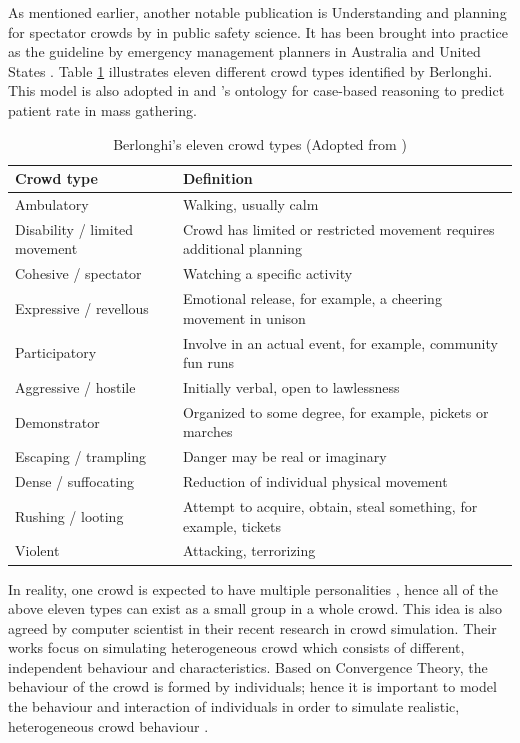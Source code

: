 As mentioned earlier, another notable publication is Understanding and planning for spectator crowds by \citet{Berlonghi1995} in public safety science. It has been brought into practice as the guideline by emergency management planners in Australia \citep{EMA1999} and United States \citep{FEMA2005}. Table \ref{table:berlonghiCrowdType} illustrates eleven different crowd types identified by Berlonghi. This model is also adopted in \citet{DelirHaghighi2013a} and \citet{Arbon2007}’s ontology for case-based reasoning to predict patient rate in mass gathering.

\begin{table}
	\caption{Berlonghi's eleven crowd types (Adopted from \citet{Zeitz2009})}
	\label{table:berlonghiCrowdType}
	\centering
	\begin{tabular}{|l|p{8cm}|}
		\hline
		\textbf{Crowd type} & \textbf{Definition} \\ \hline \hline
		Ambulatory & Walking, usually calm  \\ \hline
		Disability / limited movement & Crowd has limited or restricted movement requires additional planning \\ \hline
		Cohesive / spectator & Watching a specific activity \\ \hline
		Expressive / revellous & Emotional release, for example, a cheering movement in unison \\ \hline
		Participatory & Involve in an actual event, for example, community fun runs \\ \hline
		Aggressive / hostile & Initially verbal, open to lawlessness \\ \hline
		Demonstrator & Organized to some degree, for example, pickets or marches \\ \hline
		Escaping / trampling & Danger may be real or imaginary \\ \hline
		Dense / suffocating & Reduction of individual physical movement \\ \hline
		Rushing / looting & Attempt to acquire, obtain, steal something, for example, tickets \\ \hline
		Violent & Attacking, terrorizing \\ \hline
	\end{tabular}
\end{table}

In reality, one crowd is expected to have multiple personalities \citep{Berlonghi1995}, hence all of the above eleven types can exist as a small group in a whole crowd. This idea is also agreed by computer scientist in their recent research in crowd simulation. Their works focus on simulating heterogeneous crowd which consists of different, independent behaviour and characteristics. Based on Convergence Theory, the behaviour of the crowd is formed by individuals; hence it is important to model the behaviour and interaction of individuals in order to simulate realistic, heterogeneous crowd behaviour \citep{Guy2011}.

